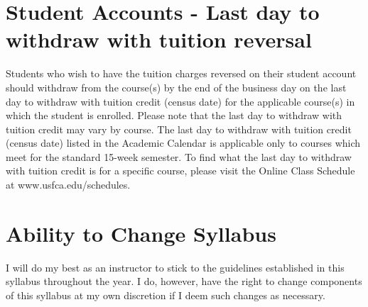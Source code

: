 \documentclass[10pt, oneside]{article}
\begin{document}
\section*{Student Accounts - Last day to withdraw with tuition reversal}
Students who wish to have the tuition charges reversed on their student account should withdraw from the course(s) by the end of the business day on the last day to withdraw with tuition credit (census date) for the applicable course(s) in which the student is enrolled. Please note that the last day to withdraw with tuition credit may vary by course. The last day to withdraw with tuition credit (census date) listed in the Academic Calendar is applicable only to courses which meet for the standard 15-week semester. To find what the last day to withdraw with tuition credit is for a specific course, please visit the Online Class Schedule at www.usfca.edu/schedules.

\section*{Ability to Change Syllabus} 
I will do my best as an instructor to stick to the guidelines established in this syllabus throughout the year. I do, however, have the right to change components of this syllabus at my own discretion if I deem such changes as necessary.


\thispagestyle{empty}
\end{document}
